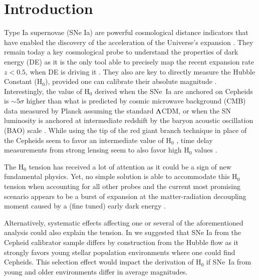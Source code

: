 \documentclass[]{aa} %
\newcommand{\mr}[1]{{\textcolor[rgb]{0.60,0.10,0.6}{#1}}}
\newcommand{\nn}[1]{{\textcolor[rgb]{1, 0.27, 0}{#1}}}
\begin{document}
\section{Introduction}
Type Ia supernovae (SNe Ia) are powerful cosmological distance indicators that
have enabled the discovery of the acceleration of the Universe's expansion
\citep{riess1998, perlmutter1999}. They remain today a key cosmological probe to
understand the properties of dark energy (DE) as it is the only tool able to
precisely map the recent expansion rate $z<0.5$, when DE is driving it
\citep[e.g.][]{scolnicastro2020}. They also are key to directly measure the
Hubble Constant (H$_0$), provided one can calibrate their absolute magnitude
\citep{riess2016, freedman2019}. Interestingly, the value of H$_0$ derived when
the SNe~Ia are anchored on Cepheids \citep[the SH0ES
project][]{riess2009,riess2016} is $\sim5\sigma$ higher than what is predicted
by cosmic microwave background (CMB) data measured by Planck assuming the
standard $\Lambda$CDM\nn{,} or when the SN luminosity is anchored at intermediate
redshift by the baryon acoustic oscillation (BAO) scale
\citep{riess2019,reid2019,planck2016, feeney2019}.  While using the tip of the
red giant branch technique in place of the Cepheids seem to favor an
\mr{intermediate} value of H$_0$ \citep{freedman2019}, time delay measurements
from strong lensing seem to also favor high H$_0$ values \citep{wong2019}.

The H$_0$ tension has received a lot of attention as it could be a sign of new
fundamental physics. Yet, no simple solution is able to accommodate this H$_0$
tension when accounting for all other probes \citep{knox2019} and the current
most promising scenario appears to be a burst of expansion at the
matter-radiation decoupling moment caused by a (fine tuned) early dark energy
\citep{poulin2019}.

Alternatively, systematic effects affecting one or several of the aforementioned
analysis could also explain the tension.  In \cite{rigault2015} we suggested
that SNe Ia from the Cepheid calibrator sample differs by construction from  the
Hubble flow as it strongly favors young stellar population environments where
one could find Cepheids. This selection effect would impact the derivation of
H$_0$ if SNe~Ia from young and older environments differ in average magnitudes. 
\end{document}
